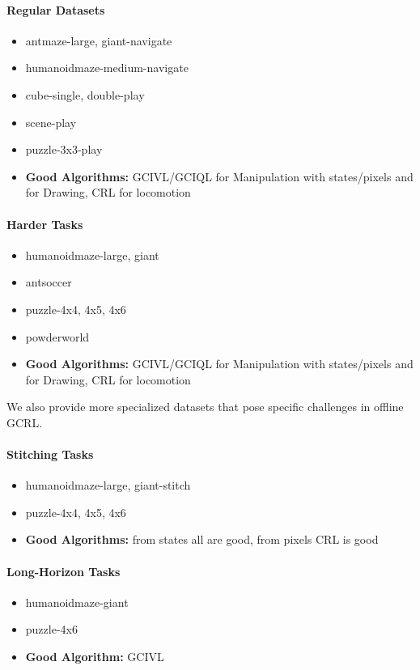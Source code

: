 \documentclass{article}
\theoremstyle{plain}
\theoremstyle{definition}
\theoremstyle{remark}
\begin{document}
\paragraph{Regular Datasets}
\begin{itemize}
    \item antmaze-{large, giant}-navigate
    \item humanoidmaze-medium-navigate
    \item cube-{single, double}-play
    \item scene-play
    \item puzzle-3x3-play
    \item \textbf{Good Algorithms:} GCIVL/GCIQL for Manipulation with states/pixels and for Drawing, CRL for locomotion
\end{itemize}

\paragraph{Harder Tasks}
\begin{itemize}
    \item humanoidmaze-{large, giant}
    \item antsoccer
    \item puzzle-{4x4, 4x5, 4x6}
    \item powderworld
    \item \textbf{Good Algorithms:} GCIVL/GCIQL for Manipulation with states/pixels and for Drawing, CRL for locomotion
\end{itemize}

We also provide more specialized datasets that pose specific challenges in offline GCRL.

\paragraph{Stitching Tasks}
\begin{itemize}
    \item humanoidmaze-{large, giant}-stitch
    \item puzzle-{4x4, 4x5, 4x6}
    \item \textbf{Good Algorithms:} from states all are good, from pixels CRL is good
\end{itemize}

\paragraph{Long-Horizon Tasks}
\begin{itemize}
    \item humanoidmaze-giant
    \item puzzle-4x6
    \item \textbf{Good Algorithm:} GCIVL
\end{itemize}
\end{document}
